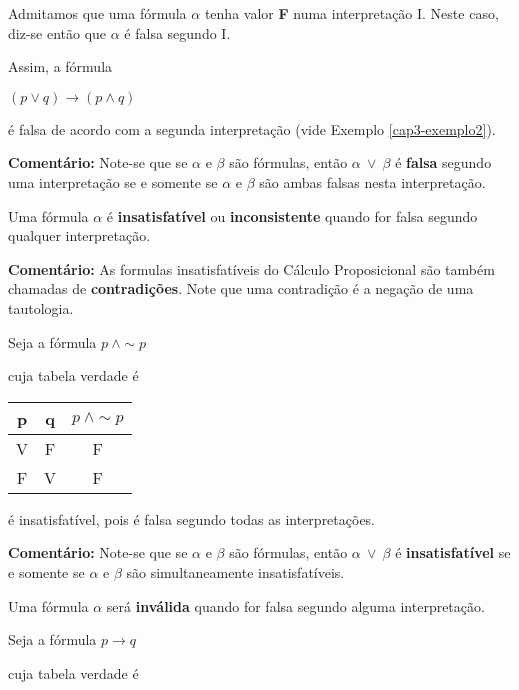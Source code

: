 \begin{defi}
    Admitamos que uma fórmula $\alpha$ tenha valor \textbf{F} numa interpretação I.
    Neste caso, diz-se então que $\alpha$ é falsa segundo I.
\end{defi}

\noindent Assim, a fórmula

\centerline{$(p \lor q) \to (p \land q)$}

\noindent é falsa de acordo com a segunda interpretação (vide Exemplo \ref{cap3-exemplo2}).

\bigskip
\noindent
\textbf{Comentário:} Note-se que se $\alpha$ e $\beta$ são fórmulas, então $\alpha\ \lor\ \beta$ é \textbf{falsa} segundo uma interpretação se e somente se $\alpha$ e $\beta$ são ambas falsas nesta interpretação.

\begin{defi}
    Uma fórmula $\alpha$ é \textbf{insatisfatível} ou \textbf{inconsistente} quando for falsa segundo qualquer interpretação.
\end{defi}

\bigskip
\noindent
\textbf{Comentário:} As formulas insatisfatíveis do Cálculo Proposicional são também chamadas de \textbf{contradições}.
Note que uma contradição é a negação de uma tautologia.

\begin{exemplo}
    Seja a fórmula $p\ \land \sim p$
\end{exemplo}
\noindent cuja tabela verdade é

\begin{center}
    \begin{tabular}{c c c}
        p & q & $p\ \land \sim p$ \\ \hline
        V & F & F \\
        F & V & F
    \end{tabular}
\end{center}
é insatisfatível, pois é falsa segundo todas as interpretações.

\bigskip
\noindent
\textbf{Comentário:} Note-se que se $\alpha$ e $\beta$ são fórmulas, então $\alpha\ \lor\ \beta$ é \textbf{insatisfatível} se e somente se $\alpha$ e $\beta$ são simultaneamente insatisfatíveis.

\begin{defi}
    Uma fórmula $\alpha$ será \textbf{inválida} quando for falsa segundo alguma interpretação.
\end{defi}

\begin{exemplo}
    Seja a fórmula $p \to q$
\end{exemplo}
\noindent cuja tabela verdade é


